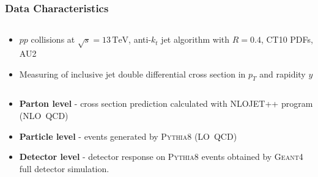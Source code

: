 \documentclass[compress]{beamer}
\newcommand{\TeV}{\,\text{TeV}}
\newcommand{\pt}{p_{T}}
\begin{document}
\begin{frame}
\frametitle{Data Characteristics}
\begin{columns}[onlytextwidth]
  \begin{column}{0.4\textwidth}
\begin{itemize}
  \item $pp$ collisions at $\sqrt{s}=13\TeV$, anti-$k_t$ jet algorithm with
    $R=0.4$, CT10 PDFs, AU2
  \item Measuring of inclusive jet double differential cross section in $\pt$
    and rapidity $y$ 
\end{itemize}
  \end{column}
  \begin{column}{0.6\textwidth}
\begin{figure}[b]
  \centering
  \texttt{[image: \{../PrezentationATLASmeeting/DataChar]}.png}
\end{figure}
  \end{column}
\end{columns}
\begin{itemize}
  \item \textbf{Parton level} - cross section prediction calculated with NLOJET++ program
    (NLO~QCD)
  \item \textbf{Particle level} - events generated by \textsc{Pythia8} (LO~QCD)
  \item \textbf{Detector level} - detector response on \textsc{Pythia8} events obtained
    by \textsc{Geant4} full detector simulation. 
\end{itemize} 
\end{frame}
\end{document}
